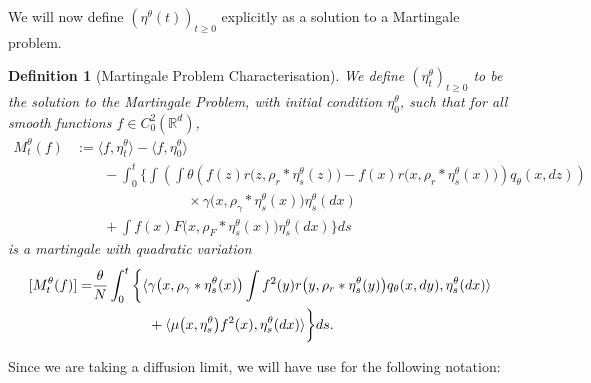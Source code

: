 \documentclass[12pt]{article}
\newtheorem{definition}[theorem]{Definition}
\begin{document}
We will now define $(\eta^{\theta}(t))_{t \geq 0}$
explicitly as a solution to a Martingale problem.

\begin{definition}[Martingale Problem Characterisation]
    \label{Def: Rescaled Models}
We define $(\eta^{\theta}_t)_{t \geq 0}$ to be the solution to the Martingale Problem,
with initial condition $\eta^{\theta}_0$,
such that for all smooth functions $f \in C^{2}_{0}(\mathbb{R}^d)$,
\begin{equation}
    \label{eq: Pre-limit Martingale Characterisation}
\begin{aligned}
M^{\theta}_t(f)
&:=  \langle f,\eta^{\theta}_t \rangle
        -\langle f,\eta^{\theta}_0 \rangle
 \\ &\qquad {}
 -  \int_{0}^{t}\bigg\{
        \int\left(   \int \theta
     \left(
        f(z)r\big(z,\rho_{r}*\eta^{\theta}_{s}(z)\big)
            -f(x)r\big(x,\rho_{r}*\eta^{\theta}_{s}(x)\big)
            \right)
                    q_\theta(x,dz)\right)
        \\ & \qquad \qquad \qquad \qquad {} \times
                            \gamma\big(x,\rho_{\gamma}*\eta^{\theta}_{s}(x)\big)
                            \eta^{\theta}_{s}(dx)
     \\ & \qquad {} +\int 
     f(x)F\big(x,\rho_{F}*\eta^{\theta}_{s}(x)\big)
     \eta^{\theta}_{s}(dx)
    \bigg\} ds
\end{aligned}    
\end{equation}
is a martingale with quadratic variation
\begin{equation}
\begin{aligned} \relax
[ M^{\theta}_t(f)] =& 
\frac{\theta}{N} \int_{0}^{t}\bigg\{
\langle \gamma\big(x,\rho_{\gamma}*\eta^{\theta}_{s}(x)\big)
\int f^2(y)r\big(y,\rho_{r}*\eta^{\theta}_{s}(y)\big)q_\theta(x,dy) 
,\eta^{\theta}_{s}(dx)\rangle\\
& \qquad \qquad +\langle \mu\big(x,\eta^{\theta}_{s}\big)f^2(x) 
,\eta^{\theta}_{s}(dx)\rangle \bigg\}ds. 
\end{aligned}    
\end{equation}


\end{definition}

Since we are taking a diffusion limit,
we will have use for the following notation:
\end{document}
